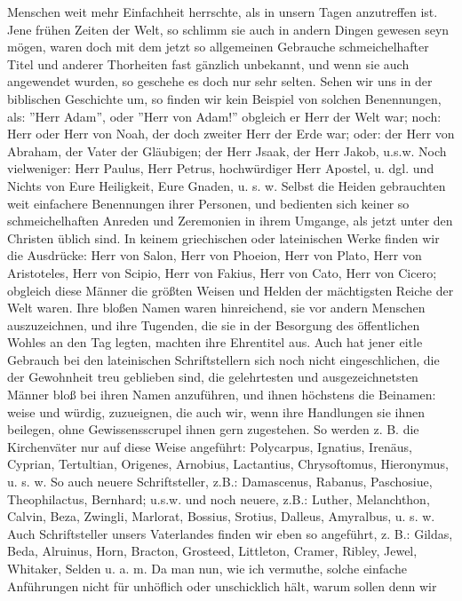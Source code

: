 Menschen weit mehr Einfachheit herrschte, als in unsern Tagen anzutreffen ist.
Jene frühen Zeiten der Welt, so schlimm sie auch in andern Dingen gewesen seyn
mögen, waren doch mit dem jetzt so allgemeinen Gebrauche schmeichelhafter Titel
und anderer Thorheiten fast gänzlich unbekannt, und wenn sie auch angewendet
wurden, so geschehe es doch nur sehr selten. Sehen wir uns in der biblischen
Geschichte um, so finden wir kein Beispiel von solchen Benennungen, als: ''Herr
Adam'', oder ''Herr von Adam!'' obgleich er Herr der Welt war; noch: Herr oder
Herr von Noah, der doch zweiter Herr der Erde war; oder: der Herr von Abraham,
der Vater der Gläubigen; der Herr Jsaak, der Herr Jakob, u.s.w. Noch
vielweniger: Herr Paulus, Herr Petrus, hochwürdiger Herr Apostel, u. dgl. und
Nichts von Eure Heiligkeit, Eure Gnaden, u. s. w. Selbst die Heiden gebrauchten
weit einfachere Benennungen ihrer Personen, und bedienten sich keiner so
schmeichelhaften Anreden und Zeremonien in ihrem Umgange, als jetzt unter den
Christen üblich sind. In keinem griechischen oder lateinischen Werke finden wir
die Ausdrücke: Herr von Salon, Herr von Phoeion, Herr von Plato, Herr von
Aristoteles, Herr von Scipio, Herr von Fakius, Herr von Cato, Herr von Cicero;
obgleich diese Männer die größten Weisen und Helden der mächtigsten Reiche der
Welt waren. Ihre bloßen Namen waren hinreichend, sie vor andern Menschen
auszuzeichnen, und ihre Tugenden, die sie in der Besorgung des öffentlichen
Wohles an den Tag legten, machten ihre Ehrentitel aus. Auch hat jener eitle
Gebrauch bei den lateinischen Schriftstellern sich noch nicht eingeschlichen,
die der Gewohnheit treu geblieben sind, die gelehrtesten und ausgezeichnetsten
Männer bloß bei ihren Namen anzuführen, und ihnen höchstens die Beinamen: weise
und würdig, zuzueignen, die auch wir, wenn ihre Handlungen sie ihnen beilegen,
ohne Gewissensscrupel ihnen gern zugestehen. So werden z. B. die Kirchenväter
nur auf diese Weise angeführt: Polycarpus, Ignatius, Irenäus, Cyprian,
Tertultian, Origenes, Arnobius, Lactantius, Chrysoftomus, Hieronymus, u. s. w.
So auch neuere Schriftsteller, z.B.: Damascenus, Rabanus, Paschosiue,
Theophilactus, Bernhard; u.s.w. und noch neuere, z.B.: Luther, Melanchthon,
Calvin, Beza, Zwingli, Marlorat, Bossius, Srotius, Dalleus, Amyralbus, u. s. w.
Auch Schriftsteller unsers Vaterlandes finden wir eben so angeführt, z. B.:
Gildas, Beda, Alruinus, Horn, Bracton, Grosteed, Littleton, Cramer, Ribley,
Jewel, Whitaker, Selden u. a. m. Da man nun, wie ich vermuthe, solche einfache
Anführungen nicht für unhöflich oder unschicklich hält, warum sollen denn wir
